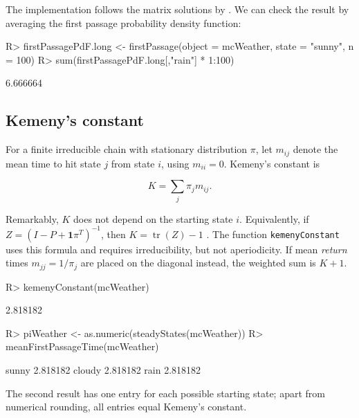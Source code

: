 \documentclass[
  nojss]{jss}
\begin{document}
The implementation follows the matrix solutions by \citep{GrinsteadSnell}. We can check the result by averaging the first passage probability density function:

\begin{CodeChunk}
\begin{CodeInput}
R> firstPassagePdF.long <- firstPassage(object = mcWeather, state = "sunny",  n = 100)
R> sum(firstPassagePdF.long[,"rain"] * 1:100)
\end{CodeInput}
\begin{CodeOutput}
[1] 6.666664
\end{CodeOutput}
\end{CodeChunk}

\subsection{Kemeny's constant}\label{kemenys-constant}

For a finite irreducible chain with stationary distribution \(\pi\), let
\(m_{ij}\) denote the mean time to hit state \(j\) from state \(i\), using
\(m_{ii}=0\). Kemeny's constant is

\[
K=\sum_j \pi_j m_{ij}.
\]

Remarkably, \(K\) does not depend on the starting state \(i\). Equivalently, if
\(Z=(I-P+\mathbf{1}\pi^T)^{-1}\), then \(K=\operatorname{tr}(Z)-1\)
\citep{kemeny1960finite}. The function \texttt{kemenyConstant} uses this formula and
requires irreducibility, but not aperiodicity. If mean \emph{return} times
\(m_{jj}=1/\pi_j\) are placed on the diagonal instead, the weighted sum is
\(K+1\).

\begin{CodeChunk}
\begin{CodeInput}
R> kemenyConstant(mcWeather)
\end{CodeInput}
\begin{CodeOutput}
[1] 2.818182
\end{CodeOutput}
\begin{CodeInput}
R> piWeather <- as.numeric(steadyStates(mcWeather))
R> meanFirstPassageTime(mcWeather) %
\end{CodeInput}
\begin{CodeOutput}
           [,1]
sunny  2.818182
cloudy 2.818182
rain   2.818182
\end{CodeOutput}
\end{CodeChunk}

The second result has one entry for each possible starting state; apart from
numerical rounding, all entries equal Kemeny's constant.
\end{document}
